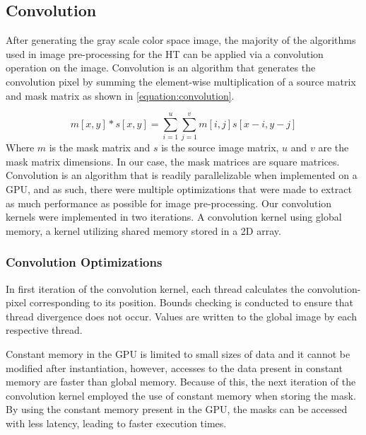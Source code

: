 \documentclass[conference]{IEEEtran}
\begin{document}


\subsection{Convolution}
After generating the gray scale color space image, the majority of the algorithms used in image pre-processing for the HT can be applied via a convolution operation on the image.
Convolution is an algorithm that generates the convolution pixel by summing the element-wise multiplication of a source matrix and mask matrix as shown in \autoref{equation:convolution}.

\begin{equation}
  m[x,y] * s[x,y] = \sum\limits_{i = 1}^{u} \sum\limits_{j = 1}^{v} m[i,j]s[x-i, y-j]
  \label{equation:convolution}
\end{equation}
Where $m$ is the mask matrix and $s$ is the source image matrix, $u$ and $v$ are the mask matrix dimensions. In our case, the mask matrices are square matrices.
Convolution is an algorithm that is readily parallelizable when implemented on a GPU, and as such, there were multiple optimizations that were made to extract as much performance as possible for image pre-processing.
Our convolution kernels were implemented in two iterations. 
A convolution kernel using global memory, a kernel utilizing shared memory stored in a 2D array.


\subsubsection*{Convolution Optimizations}
In first iteration of the convolution kernel, each thread calculates the convolution-pixel corresponding to its position. 
Bounds checking is conducted to ensure that thread divergence does not occur. 
Values are written to the global image by each respective thread.

Constant memory in the GPU is limited to small sizes of data and it cannot be modified after instantiation, however, accesses to the data present in constant memory are faster than global memory.
Because of this, the next iteration of the convolution kernel employed the use of constant memory when storing the mask. 
By using the constant memory present in the GPU, the masks can be accessed with less latency, leading to faster execution times.
\end{document}
